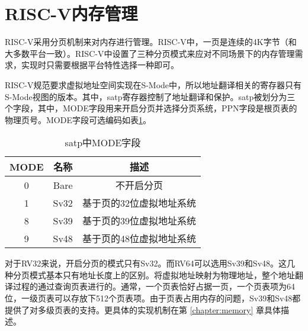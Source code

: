 \section{RISC-V内存管理}

RISC-V采用分页机制来对内存进行管理。RISC-V中，一页是连续的4K字节（和大多数平台一致）。RISC-V中设置了三种分页模式来应对不同场景下的内存管理需求，实现时只需要根据平台特性选择一种即可。

RISC-V规范要求虚拟地址空间实现在S-Mode中，所以地址翻译相关的寄存器只有S-Mode视图的版本。其中，satp寄存器控制了地址翻译和保护。satp被划分为三个字段，其中，MODE字段用来开启分页并选择分页系统，PPN字段是根页表的物理页号。MODE字段可选编码如表\ref{tab:satpmode}。

\begin{table}[h]
	\centering
	\setlength{\belowcaptionskip}{2pt}
	\caption{satp中MODE字段}
	\label{tab:satpmode}
	\begin{tabular}{|c|c|c|}
		\hline
		MODE             & 名称       & 描述                                        \\ \hline
		0                & Bare       & 不开启分页                                   \\ \hline
		1                & Sv32       & 基于页的32位虚拟地址系统                      \\ \hline
		8                & Sv39       & 基于页的39位虚拟地址系统                      \\ \hline
		9                & Sv48       & 基于页的48位虚拟地址系统                      \\ \hline
	\end{tabular}
\end{table}

对于RV32来说，开启分页的模式只有Sv32。而RV64可以选用Sv39和Sv48。这几种分页模式基本只有地址长度上的区别。将虚拟地址映射为物理地址，整个地址翻译过程的通过查询页表进行的。通常，一个页表恰好占据一页，一个页表项为64位，一级页表可以存放下512个页表项。由于页表占用内存的问题，Sv39和Sv48都提供了对多级页表的支持。更具体的实现机制在第 \ref{chapter:memory} 章具体描述。